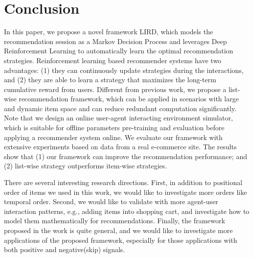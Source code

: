\section{Conclusion}
\label{sec:conclusion}

In this paper, we propose a novel framework LIRD, which models the recommendation session as a Markov Decision Process and leverages Deep Reinforcement Learning to automatically learn the optimal recommendation strategies. Reinforcement learning based recommender systems have two advantages: (1) they can continuously update strategies during the interactions, and (2) they are able to learn a strategy that maximizes the long-term cumulative reward from users. Different from previous work, we propose a list- wise recommendation framework, which can be applied in scenarios with large and dynamic item space and can reduce redundant computation significantly. Note that we design an online user-agent interacting environment simulator, which is suitable for offline parameters pre-training and evaluation before applying a recommender system online. We evaluate our framework with extensive experiments based on data from a real e-commerce site. The results show that (1) our framework can improve the recommendation performance; and (2) list-wise strategy outperforms item-wise strategies. 

There are several interesting research directions. First, in addition to positional order of items we used in this work, we would like to investigate more orders like temporal order. Second, we would like to validate with more agent-user interaction patterns, e.g., adding items into shopping cart, and investigate how to model them mathematically for recommendations. Finally, the framework proposed in the work is quite general, and we would like to investigate more applications of the proposed framework, especially for those applications with both positive and negative(skip) signals. 